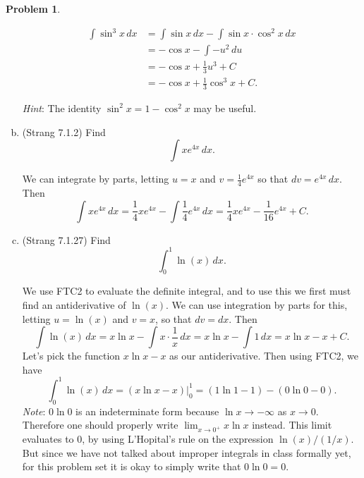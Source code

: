\documentclass[11pt,oneside]{amsart}
\theoremstyle{definition}
\newtheorem{problem}{Problem}
\begin{document}
\begin{problem}
\begin{enumerate}[(a)]
\begin{solution}
\[\begin{split}
                    \int\sin^3x\,dx &= \int\sin x\,dx -\int\sin x\cdot\cos^2x\,dx \\
                    &= -\cos x-\int -u^2\,du\\
                    &= -\cos x+\frac 13u^3+C\\
                    &= -\cos x+\frac 13\cos^3 x+C.
                \end{split}\]
            \end{solution}
            \emph{Hint}: The identity $\sin^2 x=1-\cos^2x $ may be useful.
            \item (Strang 7.1.2) Find
            \[\int xe^{4x}\,dx.\]
            \begin{solution}
                We can integrate by parts, letting $u=x$ and $v=\frac 14 e^{4x}$ so that $dv=e^{4x}\,dx$. Then
                \[\int xe^{4x}\,dx = \frac 14xe^{4x}-\int \frac 14e^{4x}\,dx=\frac 14xe^{4x}-\frac 1{16}e^{4x}+C.\]
            \end{solution}
            \item (Strang 7.1.27) Find
            \[\int_0^1\ln(x)\,dx.\]
            \begin{solution}
                We use FTC2 to evaluate the definite integral, and to use this we first must find an antiderivative of $\ln(x)$. We can use integration by parts for this, letting $u=\ln(x)$ and $v=x$, so that $dv=dx$. Then
                \[\int\ln(x)\,dx = x\ln x-\int x\cdot\frac 1x\,dx=x\ln x-\int 1\,dx=x\ln x-x+C.\]
                Let's pick the function $x\ln x-x$ as our antiderivative. Then using FTC2, we have
                \[\int_0^1\ln(x)\,dx =(x\ln x-x)\Big|_0^1=(1\ln 1-1)-(0\ln 0-0).\]
                \emph{Note}: $0\ln 0$ is an indeterminate form because $\ln x\to -\infty$ as $x\to 0$. Therefore one should properly write $\lim_{x\to 0^+}x\ln x$ instead. This limit evaluates to 0, by using L'Hopital's rule on the expression $\ln(x)/(1/x)$. But since we have not talked about improper integrals in class formally yet, for this problem set it is okay to simply write that $0\ln 0=0$.


\end{solution}
\end{enumerate}
\end{problem}
\end{document}
